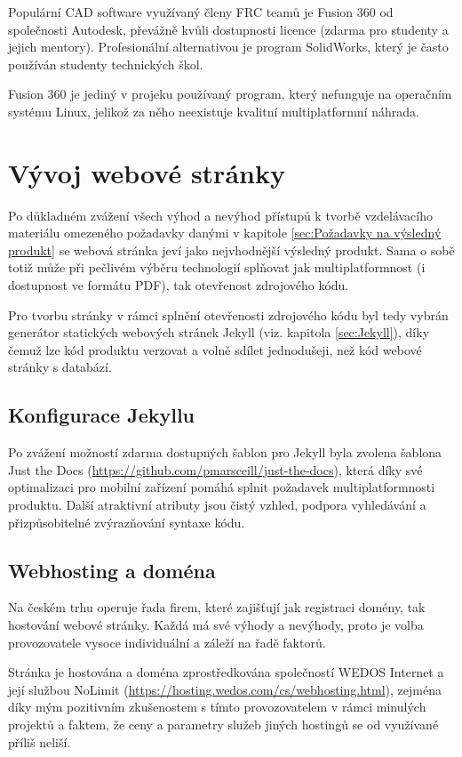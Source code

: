 \documentclass[a4paper, 12pt]{article}
\begin{document}
  Populární CAD software využívaný členy FRC teamů je Fusion 360 od společnosti Autodesk, převážně kvůli dostupnosti licence (zdarma pro studenty a jejich mentory). Profesionální alternativou je program SolidWorks, který je často používán studenty technických škol.

  Fusion 360 je jediný v projeku používaný program, který nefunguje na operačním systému Linux,  jelikož za něho neexistuje kvalitní multiplatformní náhrada.


  \section{Vývoj webové stránky}
  Po důkladném zvážení všech výhod a nevýhod přístupů k tvorbě vzdelávacího materiálu omezeného požadavky danými v kapitole \ref{sec:Požadavky na výsledný produkt} se webová stránka jeví jako nejvhodnější výsledný produkt. Sama o sobě totiž může při pečlivém výběru technologií splňovat jak multiplatformnost (i dostupnost ve formátu PDF), tak otevřenost zdrojového kódu.

  Pro tvorbu stránky v rámci splnění otevřenosti zdrojového kódu byl tedy vybrán generátor statických webových stránek Jekyll (viz. kapitola \ref{sec:Jekyll}), díky čemuž lze kód produktu verzovat a volně sdílet jednodušeji, než kód webové stránky s databází.


  \subsection{Konfigurace Jekyllu}
  Po zvážení možností zdarma dostupných šablon pro Jekyll byla zvolena šablona Just the Docs (\url{https://github.com/pmarsceill/just-the-docs}), která díky své optimalizaci pro mobilní zařízení pomáhá splnit požadavek multiplatformnosti produktu. Další atraktivní atributy jsou čistý vzhled, podpora vyhledávání a přizpůsobitelné zvýrazňování syntaxe kódu.


  \subsection{Webhosting a doména} \label{sec:Webhosting a doména}
  Na českém trhu operuje řada firem, které zajišťují jak registraci domény, tak hostování webové stránky. Každá má své výhody a nevýhody, proto je volba provozovatele vysoce individuální a záleží na řadě faktorů.

  Stránka je hostována a doména zprostředkována společností WEDOS Internet a její službou NoLimit (\url{https://hosting.wedos.com/cs/webhosting.html}), zejména díky mým pozitivním zkušenostem s tímto provozovatelem v rámci minulých projektů a faktem, že ceny a parametry služeb jiných hostingů se od využívané příliš neliší.
\end{document}
